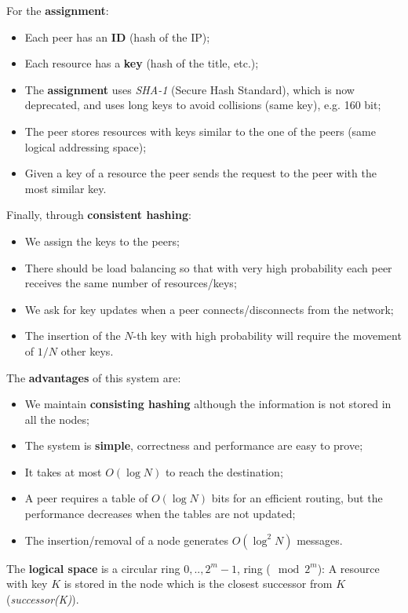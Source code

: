 For the \textbf{assignment}:
\begin{itemize}
    \item Each peer has an \textbf{ID} (hash of the IP);
    \item Each resource has a \textbf{key} (hash of the title, etc.);
    \item The \textbf{assignment} uses \textit{SHA-1} (Secure Hash Standard), which is now deprecated, and uses long keys to avoid collisions (same key), e.g. 160 bit;
    \item The peer stores resources with keys similar to the one of the peers (same logical addressing space);
    \item Given a key of a resource the peer sends the request to the peer with the most similar key.
\end{itemize}

Finally, through \textbf{consistent hashing}:
\begin{itemize}
    \item We assign the keys to the peers;
    \item There should be load balancing so that with very high probability each peer receives the same number of resources/keys;
    \item We ask for key updates when a peer connects/disconnects from the network;
    \item The insertion of the $N$-th key with high probability will require the movement of $1/N$ other keys.
\end{itemize}

The \textbf{advantages} of this system are:
\begin{itemize}
    \item We maintain \textbf{consisting hashing} although the information is not stored in all the nodes;
    \item The system is \textbf{simple}, correctness and performance are easy to prove;
    \item It takes at most $O(\log N)$ to reach the destination;
    \item A peer requires a table of $O(\log N )$ bits for an efficient routing, but the performance decreases when the tables are not updated;
    \item The insertion/removal of a node generates $O(\log^2 N)$ messages.
\end{itemize}

The \textbf{logical space} is a circular ring $0, ..,2^m - 1$, ring ($\mod 2^m$): A resource with key $K$ is stored in the node which is the closest successor from $K$ (\textit{successor(K)}).

